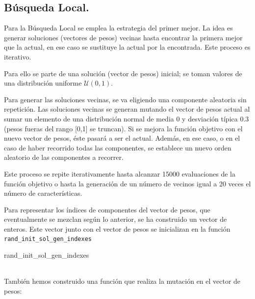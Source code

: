 \documentclass[11pt,a4paper]{article}
\theoremstyle{definition}
\begin{document}
	\subsection{Búsqueda Local.}
	Para la Búsqueda Local se emplea la estrategia del primer mejor. La idea es generar soluciones (vectores de pesos) vecinas hasta encontrar la primera mejor que la actual, en ese caso se sustituye la actual por la encontrada. Este proceso es iterativo.
	
	Para ello se parte de una solución (vector de pesos) inicial; se toman valores de una distribución uniforme $\mathcal{U}(0,1)$.
	
	Para generar las soluciones vecinas, se va eligiendo una componente aleatoria sin repetición. Las soluciones vecinas se generan mutando el vector de pesos actual al sumar un elemento de una distribución normal de media 0 y desviación típica 0.3 (pesos fueras del rango [0,1] se truncan). Si se mejora la función objetivo con el nuevo vector de pesos, éste pasará a ser el actual. Además, en ese caso, o en el caso de haber recorrido todas las componentes, se establece un nuevo orden aleatorio de las componentes a recorrer.
	
	Este proceso se repite iterativamente hasta alcanzar 15000 evaluaciones de la función objetivo o hasta la generación de un número de vecinos igual a 20 veces el número de características.
	

	Para representar los índices de componentes del vector de pesos, que eventualmente se mezclan según lo anterior, se ha construido un vector de enteros. Este vector junto con el vector de pesos se inicializan en la función \texttt{rand\_init\_sol\_gen\_indexes}~\\
	
	\begin{algorithm}[H]
		\caption{rand\_init\_sol\_gen\_indexes}
	\end{algorithm}~\\
	
	También hemos construido una función que realiza la mutación en el vector de pesos:~\\
	
\end{document}
